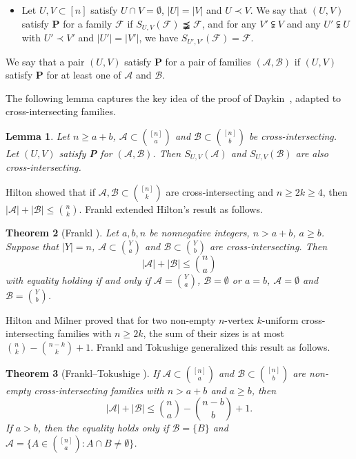\documentclass[11pt]{article}
\newcommand{\m}{\mathcal}
\newtheorem{theorem}{Theorem}[section]
\newtheorem{lemma}[theorem]{Lemma}
\begin{document}
\begin{itemize}
\item[{\bf P}] Let $U,V\subset [n]$ satisfy 
$U\cap V=\emptyset$, $|U|=|V|$ and $U\prec V$. 
We say that $(U,V)$ satisfy {\bf P} for a family $\m F$ if
 $S_{U,V}(\m F)\precneqq \m F$, and 
for any $V'\subsetneqq V$ and any $U'\subsetneqq U$ with $U'\prec V'$ and $|U'|=|V'|$, we have $S_{U',V'}(\m F)=\m F$. 
\end{itemize}

We say that a pair $(U,V)$ satisfy {\bf P} for a pair of families $(\m A, \m B)$ if $(U,V)$ satisfy {\bf P} for at least one of $\m A$ and $\m B$.
 
The following lemma captures the key idea of the proof of Daykin~\cite{Day1973}, adapted to cross-intersecting families.




\begin{lemma}\label{SUV}
Let $n\ge a+b$, \(\mathcal{A}\subset {[n]\choose a}\) and \(\mathcal{B}\subset {[n]\choose b}\) be cross-intersecting.
Let $(U,V)$ satisfy {\bf P} for $(\m A, \m B)$. Then \(S_{U,V}(\mathcal{A})\) and \(S_{U,V}(\mathcal{B})\) are also cross-intersecting.
\end{lemma}

Hilton \cite{Hilton1977} showed that if 
$\m A,\m B\subset {[n]\choose k}$ are cross-intersecting and $n\ge 2k\ge4$, then
$|\m A|+|\m B|\le {n\choose k}.$
Frankl \cite{Frankl-max-degree} extended Hilton's result as follows.
\begin{theorem}[Frankl \cite{Frankl-max-degree}]\label{12-3-3}
Let \( a, b, n \) be nonnegative integers, \( n > a + b \), \( a \geq b \).  
Suppose that \( |Y| = n \), \( \mathcal{A} \subset \binom{Y}{a} \) and \( \mathcal{B} \subset \binom{Y}{b} \) are cross-intersecting. Then  
\[
|\mathcal{A}| + |\mathcal{B}| \leq \binom{n}{a}
\]  
with equality holding if and only if \( \mathcal{A} = \binom{Y}{a} \), \( \mathcal{B} = \emptyset \) or  
\( a = b \), \( \mathcal{A} = \emptyset \) and \( \mathcal{B} = \binom{Y}{b} \).
\end{theorem}

Hilton and Milner \cite{HM1967} proved that for two non-empty $n$-vertex $k$-uniform cross-intersecting families with $n\ge 2k$, the sum of their sizes is at most ${n\choose k}-{n-k\choose k}+1$.
Frankl and Tokushige \cite{FT1992} generalized this result as follows.


\begin{theorem}[Frankl--Tokushige \cite{FT1992}]\label{12-3-2}
If $\mathcal{A} \subset \binom{[n]}{a}$ and $\mathcal{B} \subset \binom{[n]}{b}$ are non-empty cross-intersecting families with $n > a + b$ and $a \ge b$, then
\[
|\mathcal{A}| + |\mathcal{B}| \leq \binom{n}{a} - \binom{n-b}{b} + 1.
\]
If $a>b$, then the equality holds only if $\mathcal{B} = \{B\}$ and $\mathcal{A} = \{A \in \binom{[n]}{a} : A \cap B \neq \emptyset \}$.
\end{theorem}
\end{document}
